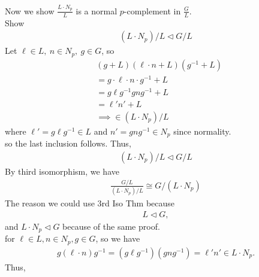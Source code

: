 \documentclass{article}
\begin{document}
\begin{homeworkProblem}
    Now we show $\frac{ L \cdot N_p }{ L }$ is a normal $p$-complement 
    in $\frac{ G }{ L }$.\\
    Show 
    \begin{align}
        (L \cdot N_p)/L \lhd G/L
    \end{align}
    Let $\ell \in L, \ n \in N_p, \ g \in G$, so
    \begin{align}
        &(g + L)(\ell \cdot n + L)(g^{-1} + L)\\
        &= g \cdot \ell \cdot n \cdot g^{-1} + L\\
        &=g \ell g^{-1} g n g^{-1} + L\\
        &= \ell' n' + L\\
        &\implies \in (L \cdot N_p) / L
    \end{align}
    where $\ell' = g \ell g^{-1} \in L$ and $n' = g n g^{-1} \in N_p$ since normality.\\
    so the last inclusion follows. Thus,
    \begin{align}
        (L \cdot N_p)/L \lhd G / L
    \end{align}
    By third isomorphism, we have 
    \begin{align}
        \frac{ G/L }{ (L \cdot N_p) / L } \cong G / (L \cdot N_p)
    \end{align}
    The reason we could use 3rd Iso Thm because
    \begin{align}
        L \lhd G,
    \end{align}
    and $L \cdot N_p \lhd G$ because of the same proof.\\
    for $\ell \in L, n \in N_p, g \in G$, so we have
    \begin{align}
        g (\ell \cdot n) g^{-1} = (g \ell g^{-1})\left( g n g^{-1} \right) = \ell' n' \in L \cdot N_p.
    \end{align}
    Thus, 
    
    
    
    

    
    
    
    
    

    


    
    
    

    




\end{homeworkProblem}

\pagebreak
\end{document}
